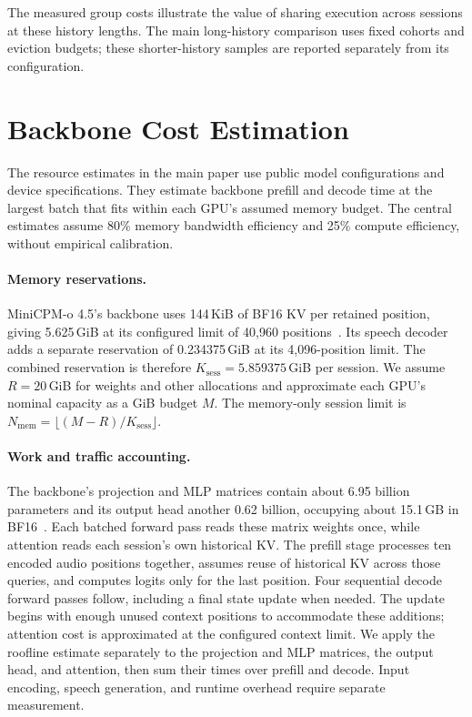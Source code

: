 \documentclass[sigplan,10pt,anonymous,review]{acmart}
\begin{document}
The measured group costs illustrate the value of sharing execution across sessions at these history lengths.
The main long-history comparison uses fixed cohorts and eviction budgets; these shorter-history samples are reported separately from its configuration.

\section{Backbone Cost Estimation}

The resource estimates in the main paper use public model configurations and device specifications.
They estimate backbone prefill and decode time at the largest batch that fits within each GPU's assumed memory budget.
The central estimates assume 80\% memory bandwidth efficiency and 25\% compute efficiency, without empirical calibration.

\paragraph{Memory reservations.}
MiniCPM-o 4.5's backbone uses 144\,KiB of BF16 KV per retained position, giving 5.625\,GiB at its configured limit of 40,960 positions~\cite{openbmb2026minicpmconfig}.
Its speech decoder adds a separate reservation of 0.234375\,GiB at its 4,096-position limit.
The combined reservation is therefore $K_{\mathrm{sess}}=5.859375$\,GiB per session.
We assume $R=20$\,GiB for weights and other allocations and approximate each GPU's nominal capacity as a GiB budget $M$.
The memory-only session limit is $N_{\mathrm{mem}}=\lfloor(M-R)/K_{\mathrm{sess}}\rfloor$.

\paragraph{Work and traffic accounting.}
The backbone's projection and MLP matrices contain about 6.95 billion parameters and its output head another 0.62 billion, occupying about 15.1\,GB in BF16~\cite{openbmb2026minicpmconfig}.
Each batched forward pass reads these matrix weights once, while attention reads each session's own historical KV.
The prefill stage processes ten encoded audio positions together, assumes reuse of historical KV across those queries, and computes logits only for the last position.
Four sequential decode forward passes follow, including a final state update when needed.
The update begins with enough unused context positions to accommodate these additions; attention cost is approximated at the configured context limit.
We apply the roofline estimate separately to the projection and MLP matrices, the output head, and attention, then sum their times over prefill and decode.
Input encoding, speech generation, and runtime overhead require separate measurement.
\end{document}
